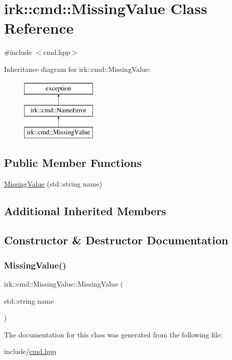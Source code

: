 \hypertarget{classirk_1_1cmd_1_1MissingValue}{}\section{irk\+:\+:cmd\+:\+:Missing\+Value Class Reference}
\label{classirk_1_1cmd_1_1MissingValue}


{\ttfamily \#include $<$cmd.\+hpp$>$}

Inheritance diagram for irk\+:\+:cmd\+:\+:Missing\+Value\+:\begin{figure}[H]
\begin{center}
\leavevmode
\includegraphics[height=3.000000cm]{classirk_1_1cmd_1_1MissingValue}
\end{center}
\end{figure}
\subsection*{Public Member Functions}
\begin{DoxyCompactItemize}
\item 
\mbox{\hyperlink{classirk_1_1cmd_1_1MissingValue_a6c7c45874f282666b8611be91e029b91}{Missing\+Value}} (std\+::string name)
\end{DoxyCompactItemize}
\subsection*{Additional Inherited Members}


\subsection{Constructor \& Destructor Documentation}
\mbox{\label{classirk_1_1cmd_1_1MissingValue_a6c7c45874f282666b8611be91e029b91}} 
\subsubsection{\texorpdfstring{Missing\+Value()}{MissingValue()}}
{\footnotesize\ttfamily irk\+::cmd\+::\+Missing\+Value\+::\+Missing\+Value (\begin{DoxyParamCaption}\item[{std\+::string}]{name }\end{DoxyParamCaption})\hspace{0.3cm}{\ttfamily [inline]}}



The documentation for this class was generated from the following file\+:\begin{DoxyCompactItemize}
\item 
include/\mbox{\hyperlink{cmd_8hpp}{cmd.\+hpp}}\end{DoxyCompactItemize}
